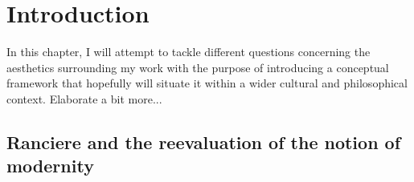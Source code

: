 \chapter{Introduction}

In this chapter, I will attempt to tackle different questions concerning the aesthetics surrounding my work with the purpose of introducing a conceptual framework that hopefully will situate it within a wider cultural and philosophical context. Elaborate a bit more...


\section{Ranciere and the reevaluation of the \mbox{notion} of modernity}

